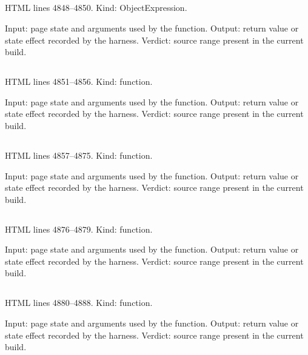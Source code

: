 \subsection*{\texttt{}}
\label{vf_207_SOP_ACTION_LABEL}
HTML lines 4848--4850. Kind: ObjectExpression.

Input: page state and arguments used by the function.
Output: return value or state effect recorded by the harness.
Verdict: source range present in the current build.

\subsection*{\texttt{}}
\label{vf_208_sopSetPath}
HTML lines 4851--4856. Kind: function.

Input: page state and arguments used by the function.
Output: return value or state effect recorded by the harness.
Verdict: source range present in the current build.

\subsection*{\texttt{}}
\label{vf_209_sopTableEditor}
HTML lines 4857--4875. Kind: function.

Input: page state and arguments used by the function.
Output: return value or state effect recorded by the harness.
Verdict: source range present in the current build.

\subsection*{\texttt{}}
\label{vf_210_sopProfileEdited}
HTML lines 4876--4879. Kind: function.

Input: page state and arguments used by the function.
Output: return value or state effect recorded by the harness.
Verdict: source range present in the current build.

\subsection*{\texttt{}}
\label{vf_211_renderSopHeader}
HTML lines 4880--4888. Kind: function.

Input: page state and arguments used by the function.
Output: return value or state effect recorded by the harness.
Verdict: source range present in the current build.

